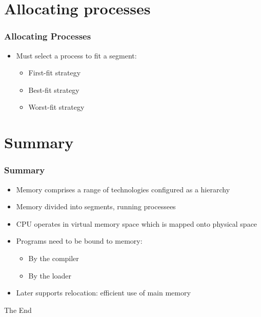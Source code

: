 \documentclass{beamer}
\begin{document}
\section{Allocating processes}
\begin{frame}
\frametitle{Allocating Processes}
\begin{itemize}
\item Must select a process to fit a segment:
\begin{itemize}
\item First-fit strategy
\item Best-fit strategy
\item Worst-fit strategy
\end{itemize}
\end{itemize}
\end{frame}
\section{Summary}
\begin{frame}
\frametitle{Summary}
\begin{itemize}
\item Memory comprises a range of technologies configured as a hierarchy
\item Memory divided into segments, running processees
\item CPU operates in virtual memory space which is mapped onto physical space
\item Programs need to be bound to memory:
\begin{itemize}
\item By the compiler
\item By the loader
\end{itemize}
\item Later supports relocation: efficient use of main memory
\end{itemize}
\end{frame}

\begin{frame} 
\Huge{\centerline{The End}}
\end{frame}
\end{document}
